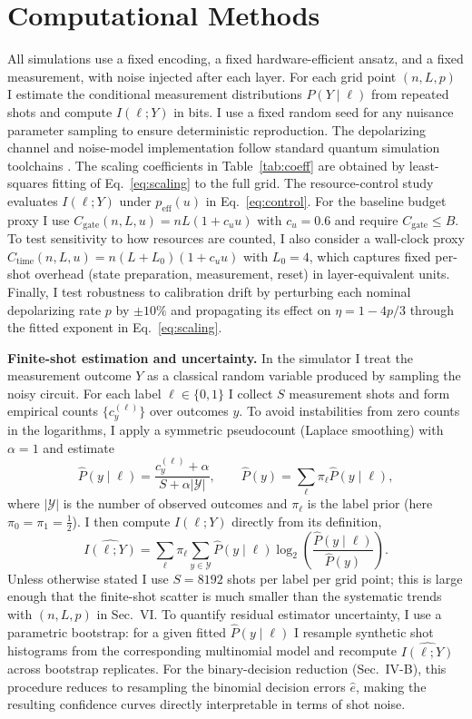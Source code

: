 \documentclass[]{ieeeaccess}
\newcommand{\MI}{I(\ell;Y)}
\newcommand{\peff}{p_{\mathrm{eff}}(u)}
\begin{document}
\section{Computational Methods}
All simulations use a fixed encoding, a fixed hardware-efficient ansatz, and a fixed measurement, with noise injected after each layer. For each grid point $(n,L,p)$ I estimate the conditional measurement distributions $P(Y\mid \ell)$ from repeated shots and compute $\MI$ in bits. I use a fixed random seed for any nuisance parameter sampling to ensure deterministic reproduction. The depolarizing channel and noise-model implementation follow standard quantum simulation toolchains \cite{ref8,ref9}. The scaling coefficients in Table~\ref{tab:coeff} are obtained by least-squares fitting of Eq.~\eqref{eq:scaling} to the full grid. The resource-control study evaluates $\MI$ under $\peff$ in Eq.~\eqref{eq:control}. For the baseline budget proxy I use $C_{\mathrm{gate}}(n,L,u)=nL(1+c_u u)$ with $c_u=0.6$ and require $C_{\mathrm{gate}}\le B$. To test sensitivity to how resources are counted, I also consider a wall-clock proxy $C_{\mathrm{time}}(n,L,u)=n(L+L_0)(1+c_u u)$ with $L_0=4$, which captures fixed per-shot overhead (state preparation, measurement, reset) in layer-equivalent units. Finally, I test robustness to calibration drift by perturbing each nominal depolarizing rate $p$ by $\pm10\%$ and propagating its effect on $\eta=1-4p/3$ through the fitted exponent in Eq.~\eqref{eq:scaling}.

\par\medskip
\noindent\textbf{Finite-shot estimation and uncertainty.}
In the simulator I treat the measurement outcome $Y$ as a classical random variable produced by sampling the noisy circuit. For each label $\ell\in\{0,1\}$ I collect $S$ measurement shots and form empirical counts $\{c_y^{(\ell)}\}$ over outcomes $y$.
To avoid instabilities from zero counts in the logarithms, I apply a symmetric pseudocount (Laplace smoothing) with $\alpha=1$ and estimate
\[
\widehat{P}(y\mid \ell)=\frac{c_y^{(\ell)}+\alpha}{S+\alpha|\mathcal{Y}|},\qquad 
\widehat{P}(y)=\sum_{\ell}\pi_{\ell}\widehat{P}(y\mid \ell),
\]
where $|\mathcal{Y}|$ is the number of observed outcomes and $\pi_{\ell}$ is the label prior (here $\pi_0=\pi_1=\tfrac{1}{2}$).
I then compute $\MI$ directly from its definition,
\[
\widehat{\MI}=\sum_{\ell}\pi_{\ell}\sum_{y\in\mathcal{Y}}
\widehat{P}(y\mid \ell)\log_2\!\left(\frac{\widehat{P}(y\mid \ell)}{\widehat{P}(y)}\right).
\]
Unless otherwise stated I use $S=8192$ shots per label per grid point; this is large enough that the finite-shot scatter is much smaller than the systematic trends with $(n,L,p)$ in Sec.~VI.
To quantify residual estimator uncertainty, I use a parametric bootstrap: for a given fitted $\widehat{P}(y\mid\ell)$ I resample synthetic shot histograms from the corresponding multinomial model and recompute $\widehat{\MI}$ across bootstrap replicates.
For the binary-decision reduction (Sec.~IV-B), this procedure reduces to resampling the binomial decision errors $\widehat{e}$, making the resulting confidence curves directly interpretable in terms of shot noise.
\par\medskip
\end{document}

